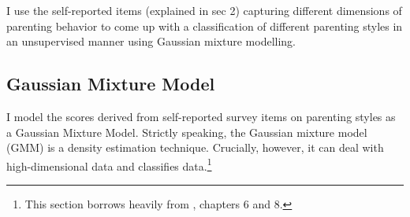 I use the self-reported items (explained in sec 2) capturing different dimensions of parenting behavior to come up with a classification of different parenting styles in an unsupervised manner using Gaussian mixture modelling.

\subsection{Gaussian Mixture Model}
I model the scores derived from self-reported survey items on parenting styles as a Gaussian Mixture Model. Strictly speaking, the Gaussian mixture model (GMM) is a density estimation technique. Crucially, however, it can deal with high-dimensional data and classifies data.\footnote{
	This section borrows heavily from \textcite{hastieElementsStatisticalLearning2009}, chapters 6 and 8.
} 

